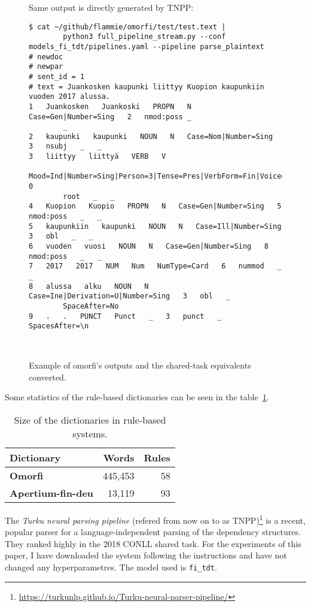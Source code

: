 \documentclass[a4paper,notitlepage]{article}
\begin{document}
\begin{figure}
\begin{tiny}
\begin{verbatim}
    \end{verbatim}
Same output is directly generated by TNPP\@:
\begin{verbatim}$ cat ~/github/flammie/omorfi/test/test.text |
        python3 full_pipeline_stream.py --conf models_fi_tdt/pipelines.yaml --pipeline parse_plaintext
# newdoc
# newpar
# sent_id = 1
# text = Juankosken kaupunki liittyy Kuopion kaupunkiin vuoden 2017 alussa.
1   Juankosken   Juankoski   PROPN   N   Case=Gen|Number=Sing   2   nmod:poss _
        _
2   kaupunki   kaupunki   NOUN   N   Case=Nom|Number=Sing   3   nsubj   _   _
3   liittyy   liittyä   VERB   V
        Mood=Ind|Number=Sing|Person=3|Tense=Pres|VerbForm=Fin|Voice=Act   0
        root   _   _
4   Kuopion   Kuopio   PROPN   N   Case=Gen|Number=Sing   5   nmod:poss   _   _
5   kaupunkiin   kaupunki   NOUN   N   Case=Ill|Number=Sing   3   obl   _   _
6   vuoden   vuosi   NOUN   N   Case=Gen|Number=Sing   8   nmod:poss   _   _
7   2017   2017   NUM   Num   NumType=Card   6   nummod   _   _
8   alussa   alku   NOUN   N   Case=Ine|Derivation=U|Number=Sing   3   obl   _
        SpaceAfter=No
9   .   .   PUNCT   Punct   _   3   punct   _   SpacesAfter=\n



        \end{verbatim}
    \end{tiny}
    \caption{Example of omorfi's outputs and the shared-task equivalents
    converted.\label{listing:io-mangling}}
\end{figure}


Some statistics of the rule-based dictionaries can be seen in the
table~\ref{table:dic-sizes}.

\begin{table}
\begin{center}
    \begin{tabular}{lrr}
        \toprule
        Dictionary & \bf Words & \bf Rules\\
        \midrule
        \bf Omorfi & 445,453 & 58 \\
        \bf Apertium-fin-deu & 13,119 & 93 \\
        \bottomrule
    \end{tabular}
    \caption{Size of the dictionaries in rule-based systems.
\label{table:dic-sizes}}
\end{center}
\end{table}

The \textit{Turku neural parsing pipeline} (refered from now on to as
TNPP)\footnote{\url{https://turkunlp.github.io/Turku-neural-parser-pipeline/}}
is a recent, popular parser for a language-independent parsing of the dependency
structures. They ranked highly in the 2018 CONLL shared task. For the
experiments of this paper, I have downloaded the system following the
instructions and have not changed any hyperparametres.  The model used is
\texttt{fi\_tdt}.
\end{document}
